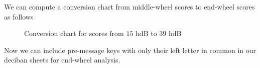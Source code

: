 \noindent We can compute a conversion chart from middle-wheel scores to end-wheel scores as follows
\begin{figure}[H]
	\begin{center}
	\end{center}
	\caption{Conversion chart for scores from $15$ hdB to $39$ hdB}
\end{figure}
\noindent Now we can include pre-message keys with only their left letter in common in our deciban sheets for end-wheel analysis.
